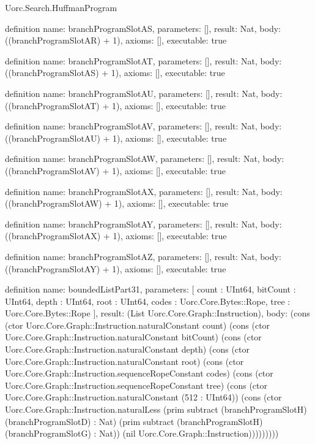 \begin{lexlean}{Uorc.Search.HuffmanProgram}
\begin{semanticmodule}
definition{
  name: branchProgramSlotAS,
  parameters: [],
  result: Nat,
  body: ((branchProgramSlotAR) + 1),
  axioms: [],
  executable: true
}

definition{
  name: branchProgramSlotAT,
  parameters: [],
  result: Nat,
  body: ((branchProgramSlotAS) + 1),
  axioms: [],
  executable: true
}

definition{
  name: branchProgramSlotAU,
  parameters: [],
  result: Nat,
  body: ((branchProgramSlotAT) + 1),
  axioms: [],
  executable: true
}

definition{
  name: branchProgramSlotAV,
  parameters: [],
  result: Nat,
  body: ((branchProgramSlotAU) + 1),
  axioms: [],
  executable: true
}

definition{
  name: branchProgramSlotAW,
  parameters: [],
  result: Nat,
  body: ((branchProgramSlotAV) + 1),
  axioms: [],
  executable: true
}

definition{
  name: branchProgramSlotAX,
  parameters: [],
  result: Nat,
  body: ((branchProgramSlotAW) + 1),
  axioms: [],
  executable: true
}

definition{
  name: branchProgramSlotAY,
  parameters: [],
  result: Nat,
  body: ((branchProgramSlotAX) + 1),
  axioms: [],
  executable: true
}

definition{
  name: branchProgramSlotAZ,
  parameters: [],
  result: Nat,
  body: ((branchProgramSlotAY) + 1),
  axioms: [],
  executable: true
}

definition{
  name: boundedListPart31,
  parameters: [
    count : UInt64,
    bitCount : UInt64,
    depth : UInt64,
    root : UInt64,
    codes : Uorc.Core.Bytes::Rope,
    tree : Uorc.Core.Bytes::Rope
  ],
  result: (List Uorc.Core.Graph::Instruction),
  body: (cons (ctor Uorc.Core.Graph::Instruction.naturalConstant count) (cons (ctor Uorc.Core.Graph::Instruction.naturalConstant bitCount) (cons (ctor Uorc.Core.Graph::Instruction.naturalConstant depth) (cons (ctor Uorc.Core.Graph::Instruction.naturalConstant root) (cons (ctor Uorc.Core.Graph::Instruction.sequenceRopeConstant codes) (cons (ctor Uorc.Core.Graph::Instruction.sequenceRopeConstant tree) (cons (ctor Uorc.Core.Graph::Instruction.naturalConstant (512 : UInt64)) (cons (ctor Uorc.Core.Graph::Instruction.naturalLess (prim subtract (branchProgramSlotH) (branchProgramSlotD) : Nat) (prim subtract (branchProgramSlotH) (branchProgramSlotG) : Nat)) (nil Uorc.Core.Graph::Instruction)))))))))
}


\end{semanticmodule}
\end{lexlean}

